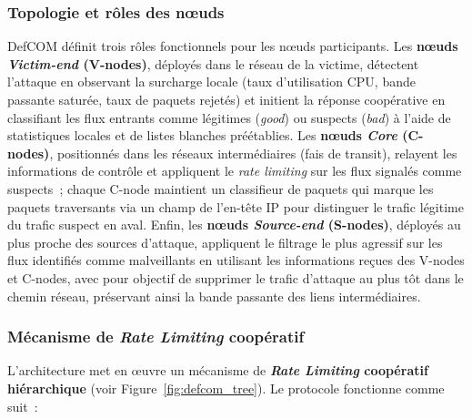 \subsubsection{Topologie et rôles des n\oe{}uds}

DefCOM définit trois rôles fonctionnels pour les n\oe{}uds participants. Les \textbf{n\oe{}uds \textit{Victim-end} (V-nodes)}, déployés dans le réseau de la victime, détectent l'attaque en observant la surcharge locale (taux d'utilisation CPU, bande passante saturée, taux de paquets rejetés) et initient la réponse coopérative en classifiant les flux entrants comme légitimes (\textit{good}) ou suspects (\textit{bad}) à l'aide de statistiques locales et de listes blanches préétablies. Les \textbf{n\oe{}uds \textit{Core} (C-nodes)}, positionnés dans les réseaux intermédiaires (\glspl{fai} de transit), relayent les informations de contrôle et appliquent le \textit{rate limiting} sur les flux signalés comme suspects~; chaque C-node maintient un classifieur de paquets qui marque les paquets traversants via un champ de l'en-tête IP pour distinguer le trafic légitime du trafic suspect en aval. Enfin, les \textbf{n\oe{}uds \textit{Source-end} (S-nodes)}, déployés au plus proche des sources d'attaque, appliquent le filtrage le plus agressif sur les flux identifiés comme malveillants en utilisant les informations reçues des V-nodes et C-nodes, avec pour objectif de supprimer le trafic d'attaque au plus tôt dans le chemin réseau, préservant ainsi la bande passante des liens intermédiaires.

\subsubsection{Mécanisme de \textit{Rate Limiting} coopératif}

L'architecture met en \oe{}uvre un mécanisme de \textbf{\textit{Rate Limiting} coopératif hiérarchique} (voir Figure~\ref{fig:defcom_tree}). Le protocole fonctionne comme suit~:

